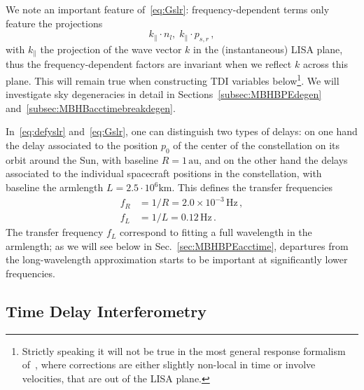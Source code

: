 \documentclass[aps,showpacs,twocolumn,prd,superscriptaddress,nofootinbib]{revtex4-1}
\newcommand{\be}{\begin{equation}}
\newcommand{\ee}{\end{equation}}
\newcommand{\bsub}{\begin{subequations}}
\newcommand{\esub}{\end{subequations}}
\newcommand{\Hz}{\,\mathrm{Hz}}
\newcommand{\au}{\,\mathrm{au}}
\begin{document}
We note an important feature of~\eqref{eq:Gslr}: frequency-dependent terms only feature the projections
\be
	k_{\parallel} \cdot n_{l}, \; k_{\parallel} \cdot p_{s,r} \,, 
\ee
with $k_{\parallel}$ the projection of the wave vector $k$ in the (instantaneous) LISA plane, thus the frequency-dependent factors are invariant when we reflect $k$ across this plane. This will remain true when constructing TDI variables below\footnote{Strictly speaking it will not be true in the most general response formalism of~\cite{MB18}, where corrections are either slightly non-local in time or involve velocities, that are out of the LISA plane.}. We will investigate sky degeneracies in detail in Sections~\ref{subsec:MBHBPEdegen} and~\ref{subsec:MBHBacctimebreakdegen}.

In~\eqref{eq:defyslr} and~\eqref{eq:Gslr}, one can distinguish two types of delays: on one hand the delay associated to the position $p_{0}$ of the center of the constellation on its orbit around the Sun, with baseline $R=1 \au$, and on the other hand the delays associated to the individual spacecraft positions in the constellation, with baseline the armlength $L=2.5 \cdot 10^{6 }\mathrm{km}$. This defines the transfer frequencies
\bsub\label{eq:transferfrequencies}
\begin{align}
	f_{R} &= 1/R = 2.0\times10^{-3}\Hz \,,\\
	f_{L} &= 1/L = 0.12\Hz \,.
\end{align}
\esub
The transfer frequency $f_{L}$ correspond to fitting a full wavelength in the armlength; as we will see below in Sec.~\ref{sec:MBHBPEacctime}, departures from the long-wavelength approximation starts to be important at significantly lower frequencies.


\subsection{Time Delay Interferometry}
\label{subsec:TDIresponse}
\end{document}
